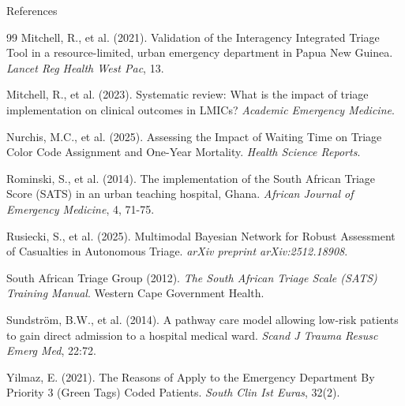 \documentclass[aspectratio=169]{beamer}
\begin{document}
\begin{frame}[allowframebreaks]{References}
\begin{thebibliography}{99}
			Mitchell, R., et al. (2021). Validation of the Interagency Integrated Triage Tool in a resource-limited, urban emergency department in Papua New Guinea. \textit{Lancet Reg Health West Pac}, 13.
			
			Mitchell, R., et al. (2023). Systematic review: What is the impact of triage implementation on clinical outcomes in LMICs? \textit{Academic Emergency Medicine}.
			
			Nurchis, M.C., et al. (2025). Assessing the Impact of Waiting Time on Triage Color Code Assignment and One-Year Mortality. \textit{Health Science Reports}.
			
			Rominski, S., et al. (2014). The implementation of the South African Triage Score (SATS) in an urban teaching hospital, Ghana. \textit{African Journal of Emergency Medicine}, 4, 71-75.
			
			Rusiecki, S., et al. (2025). Multimodal Bayesian Network for Robust Assessment of Casualties in Autonomous Triage. \textit{arXiv preprint arXiv:2512.18908}.
			
			South African Triage Group (2012). \textit{The South African Triage Scale (SATS) Training Manual}. Western Cape Government Health.
			
			Sundstr\"om, B.W., et al. (2014). A pathway care model allowing low-risk patients to gain direct admission to a hospital medical ward. \textit{Scand J Trauma Resusc Emerg Med}, 22:72.
			
			Yilmaz, E. (2021). The Reasons of Apply to the Emergency Department By Priority 3 (Green Tags) Coded Patients. \textit{South Clin Ist Euras}, 32(2).
			
		\end{thebibliography}
	\end{frame}
	
\end{document}
